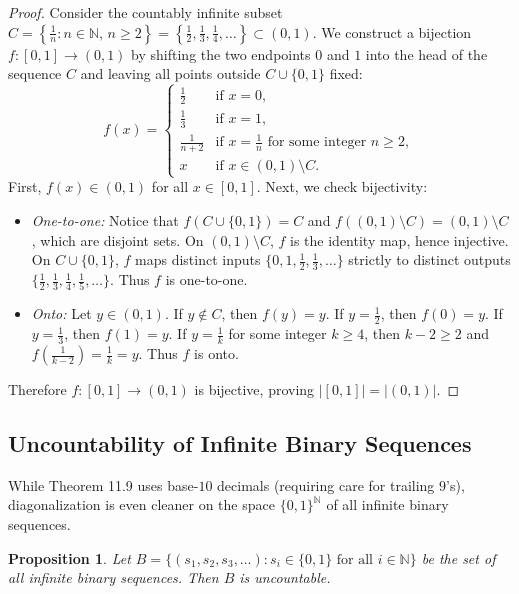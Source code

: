 \documentclass[11pt, letterpaper]{article}
\newtheorem{proposition}[theorem]{Proposition}
\theoremstyle{definition}
\theoremstyle{remark}
\begin{document}
\begin{proof}
Consider the countably infinite subset $C = \left\{\frac{1}{n} : n \in \mathbb{N},\, n \ge 2\right\} = \left\{\frac{1}{2}, \frac{1}{3}, \frac{1}{4}, \dots\right\} \subset (0, 1)$. We construct a bijection $f : [0, 1] \to (0, 1)$ by shifting the two endpoints $0$ and $1$ into the head of the sequence $C$ and leaving all points outside $C \cup \{0, 1\}$ fixed:
\[
f(x) = \begin{cases}
\frac{1}{2} & \text{if } x = 0, \\
\frac{1}{3} & \text{if } x = 1, \\
\frac{1}{n + 2} & \text{if } x = \frac{1}{n} \text{ for some integer } n \ge 2, \\
x & \text{if } x \in (0, 1) \setminus C.
\end{cases}
\]
First, $f(x) \in (0, 1)$ for all $x \in [0, 1]$. Next, we check bijectivity:
\begin{itemize}
    \item \emph{One-to-one:} Notice that $f(C \cup \{0, 1\}) = C$ and $f((0, 1) \setminus C) = (0, 1) \setminus C$, which are disjoint sets. On $(0, 1) \setminus C$, $f$ is the identity map, hence injective. On $C \cup \{0, 1\}$, $f$ maps distinct inputs $\{0, 1, \frac{1}{2}, \frac{1}{3}, \dots\}$ strictly to distinct outputs $\{\frac{1}{2}, \frac{1}{3}, \frac{1}{4}, \frac{1}{5}, \dots\}$. Thus $f$ is one-to-one.
    \item \emph{Onto:} Let $y \in (0, 1)$. If $y \notin C$, then $f(y) = y$. If $y = \frac{1}{2}$, then $f(0) = y$. If $y = \frac{1}{3}$, then $f(1) = y$. If $y = \frac{1}{k}$ for some integer $k \ge 4$, then $k - 2 \ge 2$ and $f\!\left(\frac{1}{k - 2}\right) = \frac{1}{k} = y$. Thus $f$ is onto.
\end{itemize}
Therefore $f : [0, 1] \to (0, 1)$ is bijective, proving $|[0, 1]| = |(0, 1)|$.
\end{proof}

\subsection{Uncountability of Infinite Binary Sequences}

While Theorem 11.9 uses base-$10$ decimals (requiring care for trailing $9$'s), diagonalization is even cleaner on the space $\{0, 1\}^{\mathbb{N}}$ of all infinite binary sequences.

\begin{proposition}
Let $B = \{ (s_1, s_2, s_3, \dots) : s_i \in \{0, 1\} \text{ for all } i \in \mathbb{N} \}$ be the set of all infinite binary sequences. Then $B$ is uncountable.
\end{proposition}
\end{document}
